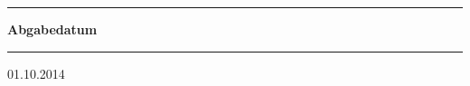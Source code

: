 \begin{titlepage}
\begin{minipage}[b]{0.91\textwidth}
	\begin{minipage}[b]{0.27\textwidth}
	\hrule\vskip 0.5cm
		\textbf{Abgabedatum}
	\end{minipage}
	\begin{minipage}[b]{0.03\textwidth}
	\hskip 0.5cm
	\end{minipage}
	\begin{minipage}[b]{0.7\textwidth}
	\hrule\vskip 0.5cm
		01.10.2014
	\end{minipage}

\end{minipage}
\vskip 0.5cm


\end{titlepage}
